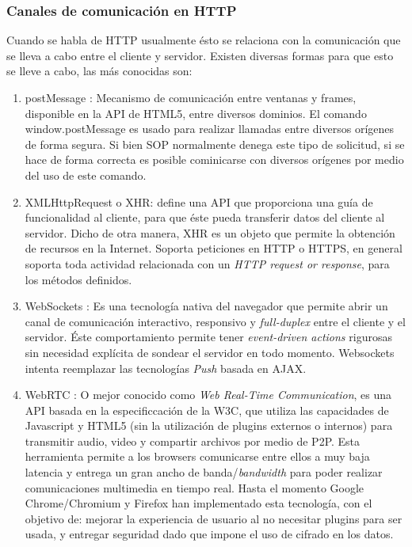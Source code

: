         \subsubsection{Canales de comunicación en HTTP}
        \label{chap2:comunHTTP}
        Cuando se habla de HTTP usualmente ésto se relaciona con la comunicación que se lleva a cabo entre el cliente y servidor. Existen diversas formas para que esto se lleve a cabo, las más conocidas son:
        \begin{enumerate}
            \item postMessage \cite{webMessaging}: Mecanismo de comunicación entre ventanas y frames, disponible en la API de HTML5, entre diversos dominios. El comando window.postMessage es usado para realizar llamadas entre diversos orígenes de forma segura. Si bien SOP normalmente denega este tipo de solicitud, si se hace de forma correcta es posible cominicarse con diversos orígenes por medio del uso de este comando.

            \item XMLHttpRequest o XHR: \cite{XHR} define una API que proporciona una guía de funcionalidad al cliente, para que éste pueda transferir datos del cliente al servidor. Dicho de otra manera, XHR es un objeto que permite la obtención de recursos en la Internet. Soporta peticiones en HTTP o HTTPS, en general soporta toda actividad relacionada con un \textit{HTTP request or response}, para los métodos definidos.

            \item WebSockets \cite{WebSocket}: Es una tecnología nativa del navegador que permite abrir un canal de comunicación interactivo, responsivo y \textit{full-duplex} entre el cliente y el servidor. Éste comportamiento permite tener \textit{event-driven actions} rigurosas sin necesidad explícita de sondear el servidor en todo momento. Websockets intenta reemplazar las tecnologías \textit{Push} basada en AJAX.

            \item WebRTC \cite{WebRTC}: O mejor conocido como \textit{Web Real-Time Communication}, es una API basada en la especificcación de la W3C, que utiliza las capacidades de Javascript y HTML5 (sin la utilización de plugins externos o internos) para transmitir audio, video y compartir archivos por medio de P2P. Esta herramienta permite a los browsers comunicarse entre ellos a muy baja latencia y entrega un gran ancho de banda/\textit{bandwidth} para poder realizar comunicaciones multimedia en tiempo real. Hasta el momento Google Chrome/Chromium y Firefox han implementado esta tecnología, con el objetivo de: mejorar la experiencia de usuario al no necesitar plugins para ser usada, y entregar seguridad dado que impone el uso de cifrado en los datos.
        \end{enumerate}

